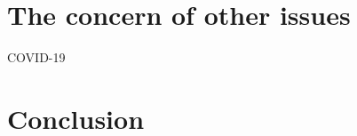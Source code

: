 \documentclass[conference]{IEEEtran}
\begin{document}
\section{The concern of other issues}


COVID-19
\\

\section{Conclusion}




\end{document}

